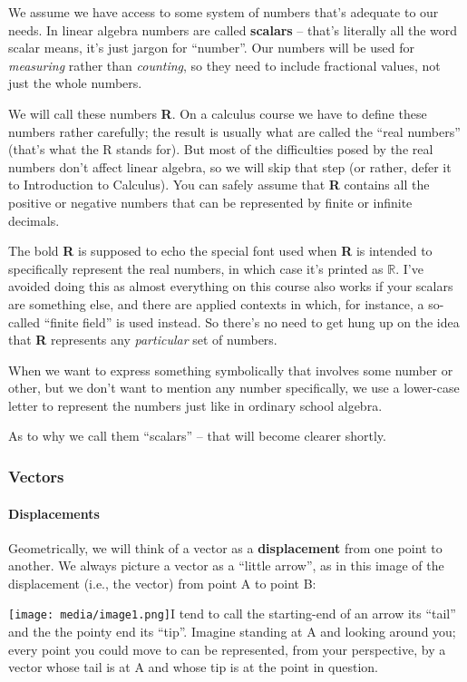 \documentclass[oneside,english]{amsbook}
\numberwithin{section}{chapter}
\theoremstyle{plain}
\theoremstyle{definition}
\begin{document}
We assume we have access to some system of numbers that's adequate to
our needs. In linear algebra numbers are called \textbf{scalars} --
that's literally all the word scalar means, it's just jargon for
``number''. Our numbers will be used for \emph{measuring} rather than
\emph{counting}, so they need to include fractional values, not just the
whole numbers.

We will call these numbers \textbf{R}. On a calculus course we have to
define these numbers rather carefully; the result is usually what are
called the ``real numbers'' (that's what the R stands for). But most of
the difficulties posed by the real numbers don't affect linear algebra,
so we will skip that step (or rather, defer it to Introduction to
Calculus). You can safely assume that \textbf{R} contains all the
positive or negative numbers that can be represented by finite or
infinite decimals.

The bold \textbf{R} is supposed to echo the special font used when
\textbf{R} is intended to specifically represent the real numbers, in
which case it's printed as \(\mathbb{R}\). I've avoided doing this as
almost everything on this course also works if your scalars are
something else, and there are applied contexts in which, for instance, a
so-called ``finite field'' is used instead. So there's no need to get
hung up on the idea that \textbf{R} represents any \emph{particular} set
of numbers.

When we want to express something symbolically that involves some number
or other, but we don't want to mention any number specifically, we use a
lower-case letter to represent the numbers just like in ordinary school
algebra.

As to why we call them ``scalars'' -- that will become clearer shortly.

\subsubsection{Vectors}

\paragraph{Displacements}

Geometrically, we will think of a vector as a \textbf{displacement} from
one point to another. We always picture a vector as a ``little arrow'',
as in this image of the displacement (i.e., the vector) from point A to
point B:

\texttt{[image: media/image1.png]}I
tend to call the starting-end of an arrow its ``tail'' and the the
pointy end its ``tip''. Imagine standing at A and looking around you;
every point you could move to can be represented, from your perspective,
by a vector whose tail is at A and whose tip is at the point in
question.
\end{document}
